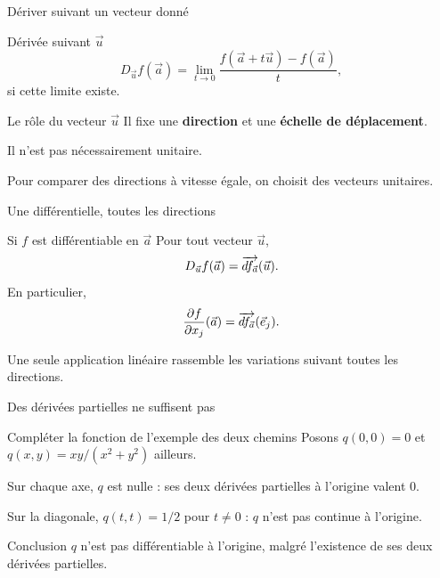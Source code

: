 \begin{frame}[t]{Dériver suivant un vecteur donné}
\coursanalyse
\begin{notion}{Dérivée suivant $\vec u$}
\[D_{\vec u}f(\vec a)=\lim_{t\to0}\frac{f(\vec a+t\vec u)-f(\vec a)}{t},\]
si cette limite existe.
\end{notion}
\begin{cours}{Le rôle du vecteur $\vec u$}
Il fixe une \textbf{direction} et une \textbf{échelle de déplacement}.

\medskip
Il n'est pas nécessairement unitaire.
\end{cours}
\vfill Pour comparer des directions à vitesse égale, on choisit des vecteurs unitaires.
\end{frame}

\begin{frame}[t]{Une différentielle, toutes les directions}
\coursanalyse
\begin{theoreme}{Si $f$ est différentiable en $\vec a$}
Pour tout vecteur $\vec u$,
\[D_{\vec u}f(\vec a)=\overrightarrow{df_{\vec a}}(\vec u).\]
En particulier,
\[\frac{\partial f}{\partial x_j}(\vec a)=\overrightarrow{df_{\vec a}}(\vec e_j).\]
\end{theoreme}
\vfill Une seule application linéaire rassemble les variations suivant toutes les directions.
\end{frame}

\begin{frame}[t]{Des dérivées partielles ne suffisent pas}
\coursanalyse
\begin{exemple}{Compléter la fonction de l'exemple des deux chemins}
Posons $q(0,0)=0$ et $q(x,y)=xy/(x^2+y^2)$ ailleurs.

\medskip
Sur chaque axe, $q$ est nulle : ses deux dérivées partielles à l'origine valent $0$.

\medskip
Sur la diagonale, $q(t,t)=1/2$ pour $t\ne0$ : $q$ n'est pas continue à l'origine.
\end{exemple}
\begin{resultat}{Conclusion}
$q$ n'est pas différentiable à l'origine, malgré l'existence de ses deux dérivées partielles.
\end{resultat}
\end{frame}

